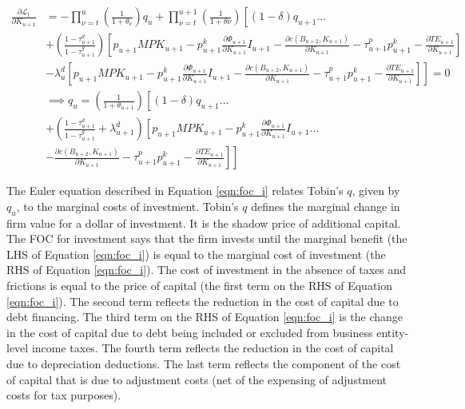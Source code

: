  \begin{equation}
\label{eqn:foc_k}
\begin{split}
 \frac{\partial \mathcal{L}_{t}}{\partial K_{u+1}}  &=  - \prod_{\nu=t}^{u}\left(\frac{1}{1+\theta_{\nu}}\right)q_{u}  + \prod_{\nu=t}^{u+1}\left(\frac{1}{1+\theta{\nu}}\right)\left[(1-
\delta)q_{u+1} ... \right. \\
&\left. +    \left(\frac{1-\tau^{d}_{u+1}}{1-\tau^{g}_{u+1}}\right)\left[p_{u+1}MPK_{u+1} - p^{k}_{u+1}\frac{\partial \Phi_{u+1}}{\partial K_{u+1}}I_{u+1} - \frac{\partial c(B_{u+2},K_{u+1})}{\partial K_{u+1}}-\tau^{p}_{u+1}p^{k}_{u+1}-\frac{\partial TE_{u+1}}{\partial K_{u+1}} \right] \right. \\
& \left. - \lambda^{d}_{u}\left[p_{u+1}MPK_{u+1} - p^{k}_{u+1}\frac{\partial \Phi_{u+1}}{\partial K_{u+1}}I_{u+1} - \frac{\partial c(B_{u+2},K_{u+1})}{\partial K_{u+1}}-\tau^{p}_{u+1}p^{k}_{u+1}-\frac{\partial TE_{u+1}}{\partial K_{u+1}} \right] \right] = 0 \\
&\implies q_{u} = \left(\frac{1}{1+\theta_{u+1}}\right)\left[(1-\delta)q_{u+1} ... \right. \\
& \left. +  \left(\frac{1-\tau^{d}_{u+1}}{1-\tau^{g}_{u+1}} + \lambda^{d}_{u+1} \right)\left[p_{u+1}MPK_{u+1}- p^{k}_{u+1}\frac{\partial \Phi_{u+1}}{\partial K_{u+1}}I_{u+1}  ... \right.\right. \\
& \left.\left.- \frac{\partial c(B_{u+2},K_{u+1})}{\partial K_{u+1}}-\tau^{p}_{u+1}p^{k}_{u+1}-\frac{\partial TE_{u+1}}{\partial K_{u+1}} \right] \right]
\end{split}
\end{equation}

\noindent\noindent The Euler equation described in Equation \ref{eqn:foc_i} relates Tobin's $q$, given by $q_{u}$, to the marginal costs of investment.  Tobin's $q$ defines the marginal change in firm value for a dollar of investment. It is the shadow price of additional capital.  The FOC for investment says that the firm invests until the marginal benefit (the LHS of Equation \ref{eqn:foc_i}) is equal to the marginal cost of investment (the RHS of Equation \ref{eqn:foc_i}).  The cost of investment in the absence of taxes and frictions is equal to the price of capital (the first term on the RHS of Equation \ref{eqn:foc_i}).  The second term reflects the reduction in the cost of capital due to debt financing.  The third term on the RHS of Equation \ref{eqn:foc_i} is the change in the cost of capital due to debt being included or excluded from business entity-level income taxes.  The fourth term reflects the reduction in the cost of capital due to depreciation deductions.  The last term reflects the component of the cost of capital that is due to adjustment costs (net of the expensing of adjustment costs for tax purposes).

